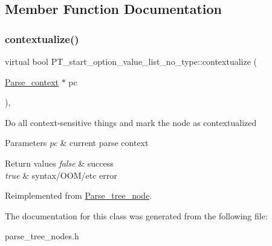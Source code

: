 \subsection{Member Function Documentation}
\mbox{\label{classPT__start__option__value__list__no__type_ab92ce1db2e283950ed9dedc12cd89ca9}} 
\subsubsection{\texorpdfstring{contextualize()}{contextualize()}}
{\footnotesize\ttfamily virtual bool P\+T\+\_\+start\+\_\+option\+\_\+value\+\_\+list\+\_\+no\+\_\+type\+::contextualize (\begin{DoxyParamCaption}\item[{\mbox{\hyperlink{structParse__context}{Parse\+\_\+context}} $\ast$}]{pc }\end{DoxyParamCaption})\hspace{0.3cm}{\ttfamily [inline]}, {\ttfamily [virtual]}}

Do all context-\/sensitive things and mark the node as contextualized


\begin{DoxyParams}{Parameters}
{\em pc} & current parse context\\
\hline
\end{DoxyParams}

\begin{DoxyRetVals}{Return values}
{\em false} & success \\
\hline
{\em true} & syntax/\+O\+O\+M/etc error \\
\hline
\end{DoxyRetVals}


Reimplemented from \mbox{\hyperlink{classParse__tree__node_a22d93524a537d0df652d7efa144f23da}{Parse\+\_\+tree\+\_\+node}}.



The documentation for this class was generated from the following file\+:\begin{DoxyCompactItemize}
\item 
parse\+\_\+tree\+\_\+nodes.\+h\end{DoxyCompactItemize}
